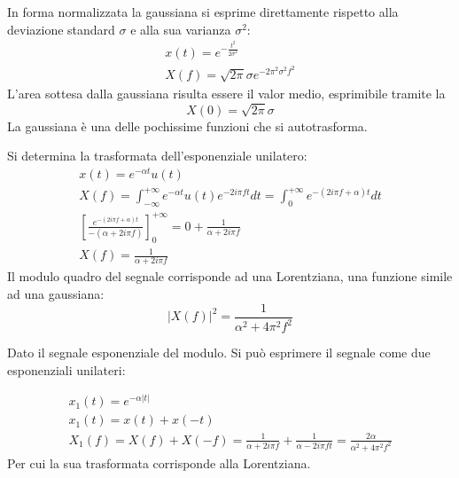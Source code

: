 \documentclass{article}
\numberwithin{equation}{subsection}
\begin{document}
In forma normalizzata la gaussiana si esprime direttamente rispetto alla deviazione standard $\sigma$ e alla sua varianza $\sigma^2$:
\begin{gather*}
    x(t)=e^{-\frac{t^2}{2\sigma^2}}\\
    X(f)=\sqrt{2\pi}\sigma e^{-2\pi^2\sigma^2f^2}
\end{gather*}
L'area sottesa dalla gaussiana risulta essere il valor medio, esprimibile tramite la 
\begin{equation*}
    X(0)=\sqrt{2\pi}\sigma
\end{equation*}
La gaussiana è una delle pochissime funzioni che si autotrasforma. 

Si determina la trasformata dell'esponenziale unilatero:
\begin{gather*}
    x(t)=e^{-\alpha t}u(t)\\
    X(f)=\displaystyle\int_{-\infty}^{+\infty}e^{-\alpha t}u(t)e^{-2i\pi ft}dt=\int_0^{+\infty}e^{-(2i\pi f+\alpha)t}dt\\
    \left[\displaystyle\frac{e^{-(2i\pi f+\alpha)t}}{-(\alpha+2i\pi f)}\right]^{+\infty}_0=0+\frac{1}{\alpha+2i\pi f}\\
    X(f)=\frac{1}{\alpha+ 2i\pi f}
\end{gather*}
Il modulo quadro del segnale corrisponde ad una Lorentziana, una funzione simile ad una gaussiana: 
\begin{equation*}
    \left|X(f)\right|^2=\frac{1}{\alpha^2+4\pi^2f^2}
\end{equation*}
\begin{center}
\end{center}


Dato il segnale esponenziale del modulo. Si può esprimere il segnale come due esponenziali unilateri:
\begin{center}
\end{center}
\begin{gather*}
    x_1(t)=e^{-\alpha|t|}\\
    x_1(t)=x(t)+x(-t)\\
    X_1(f)=X(f)+X(-f)=\displaystyle\frac{1}{\alpha+2i\pi f}+\frac{1}{\alpha-2i\pi ft}=\frac{2\alpha}{\alpha^2+4\pi^2f^2}
\end{gather*}
Per cui la sua trasformata corrisponde alla Lorentziana. 
\end{document}
